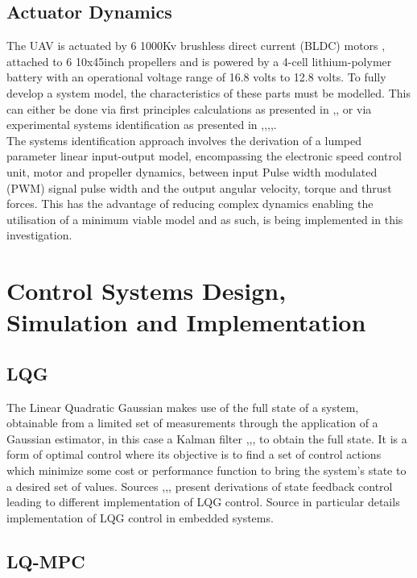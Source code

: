 \documentclass[12pt,a4paper,twoside]{report}
\begin{document}
			\subsection{Actuator Dynamics}	
			
				The UAV is actuated by 6 1000Kv brushless direct current (BLDC) motors \cite{14}, attached to 6 10x45inch propellers and is powered by a 4-cell lithium-polymer battery with an operational voltage range of 16.8 volts to 12.8 volts. To fully develop a system model, the characteristics of these parts must be modelled. This can either be done via first principles calculations as presented in \cite{2},\cite{8},\cite{17} or via experimental systems identification as presented in \cite{9},\cite{12},\cite{14},\cite{15},\cite{16}. 
				\\
				The systems identification approach involves the derivation of a lumped parameter linear input-output model, encompassing the electronic speed control unit, motor and propeller dynamics, between input Pulse width modulated (PWM) signal pulse width and the output angular velocity, torque and thrust forces. This has the advantage of reducing complex dynamics enabling the utilisation of a minimum viable model and as such, is being implemented in this investigation.
				
		\section{Control Systems Design, Simulation and Implementation}
		
			\subsection{LQG}
			
				The Linear Quadratic Gaussian makes use of the full state of a system, obtainable from a limited set of measurements through the application of a Gaussian estimator, in this case a Kalman filter \cite{21},\cite{22},\cite{23},\cite{24} to obtain the full state. It is a form of optimal control where its objective is to find a set of control actions which minimize some cost or performance function to bring the system’s state to a desired set of values. Sources \cite{18},\cite{19},\cite{20},\cite{25} present derivations of state feedback control leading to different implementation of LQG control. Source \cite{19} in particular details implementation of LQG control in embedded systems.
				
			\subsection{LQ-MPC}
			
\end{document}
